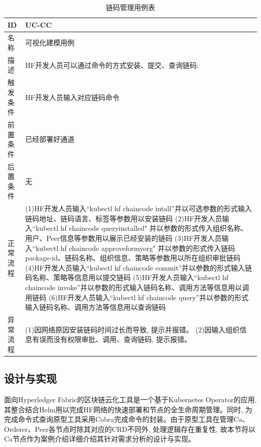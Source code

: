 {\footnotesize
\begin{longtable}[h]{m{60pt}|m{280pt}}
    \caption[链码管理用例表]{链码管理用例表} \label{cc_use_case} \\
        \hline  
        ID&UC-CC\\
        \hline
        名称&可视化建模用例\\
        \hline
        描述&HF开发人员可以通过命令的方式安装、提交、查询链码;\\
        \hline
        触发条件&HF开发人员输入对应链码命令\\
        \hline
        前置条件&已经部署好通道\\
        \hline
        后置条件&无\\
        \hline
        正常流程& (1)HF开发人员输入“kubectl hf chaincode intall”并以可选参数的形式输入链码地址、链码语言、标签等参数用以安装链码
        \newline (2)HF开发人员输入“kubectl hf chaincode queryinstalled" 并以参数的形式传入组织名称、用户、Peer信息等参数用以展示已经安装的链码
         \newline (3)HF开发人员输入“kubectl hf chaincode approveformyorg" 并以参数的形式传入链码package-id、链码名称、组织信息、策略等参数用以所在组织审批链码
        \newline (4)HF开发人员输入“kubectl hf chaincode commit”并以参数的形式输入链码名称、策略等信息用以提交链码
        \newline (5)HF开发人员输入“kubectl hf chaincode invoke”并以参数的形式输入链码名称、调用方法等信息用以调用链码
        \newline (6)HF开发人员输入“kubectl hf chaincode query”并以参数的形式输入链码名称、调用方法等信息用以查询链码\\
        \hline 
        异常流程& (1)因网络原因安装链码时间过长而导致, 提示并报错。
        \newline (2)因输入组织信息有误而没有权限审批、调用、查询链码, 提示报错。\\
        \hline
    \end{longtable} 
}

\subsection{设计与实现}

面向Hyperledger Fabric的区块链云化工具是一个基于Kubernetes Operator的应用, 其整合结合Helm用以完成HF网络的快速部署和节点的全生命周期管理。同时, 为完成命令式查询原型工具采用Cobra\footnotemark[1]完成命令的封装。由于原型工具在管理Ca、Orderer、Peer各节点时除其对应的CRD不同外, 处理逻辑存在重复性, 故本节将以Ca节点作为案例介绍详细介绍其针对需求分析的设计与实现。

